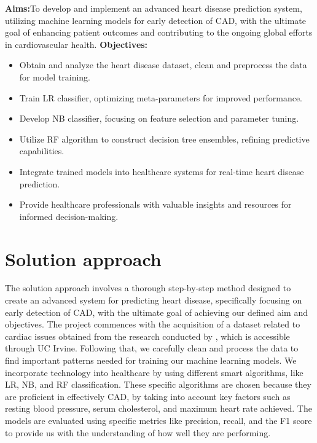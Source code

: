 \textbf{Aims:}To develop and implement an advanced heart disease prediction system, utilizing 
machine learning models for early detection of CAD, with the ultimate goal 
of enhancing patient outcomes and contributing to the ongoing global efforts in cardiovascular 
health.
\textbf{Objectives:}
\begin{itemize}
    \item Obtain and analyze the heart disease dataset, clean and preprocess the data for model training.
    \item Train LR classifier, optimizing meta-parameters for improved performance.
    \item Develop NB classifier, focusing on feature selection and parameter tuning.
    \item Utilize RF algorithm to construct decision tree ensembles, refining predictive capabilities.
    \item Integrate trained models into healthcare systems for real-time heart disease prediction.
    \item Provide healthcare professionals with valuable insights and resources for informed decision-making.
\end{itemize}



\section{Solution approach}
\label{sec:intro_sol} %
The solution approach involves a thorough step-by-step method designed to create an advanced 
system for predicting heart disease, specifically focusing on early detection of CAD, with the ultimate goal of achieving our defined aim and objectives. The 
project commences with the acquisition of a dataset related to cardiac issues obtained from the 
research conducted by \cite{janosi-1988}, which is accessible through UC Irvine. Following 
that, we carefully clean and process the data to find important patterns needed for training 
our machine learning models. We incorporate technology into healthcare by using different smart 
algorithms, like LR, NB, and RF classification. These 
specific algorithms are chosen because they are proficient in effectively CAD, by taking into account key factors such as resting blood pressure, serum 
cholesterol, and maximum heart rate achieved. The models are evaluated using specific metrics 
like precision, recall, and the F1 score to provide us with the understanding of how well they 
are performing.




